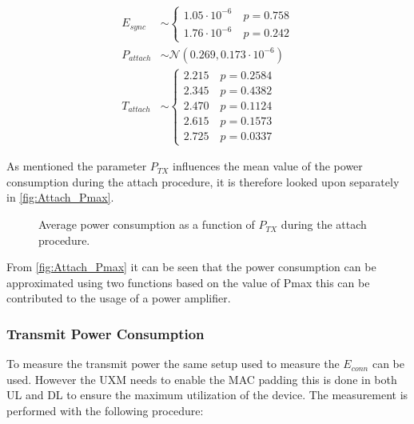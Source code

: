 \begin{align}
E_{sync} &\sim\begin{cases} 1.05\cdot 10^{-6} \quad p = 0.758\\
1.76\cdot 10^{-6} \quad p = 0.242
\end{cases}\\
P_{attach} &\sim\mathcal{N}(0.269,0.173\cdot 10^{-6}) \\
T_{attach} &\sim\begin{cases} 2.215 \quad p = 0.2584\\
2.345 \quad p = 0.4382\\
2.470 \quad p = 0.1124\\
2.615 \quad p = 0.1573\\
2.725 \quad p = 0.0337
\end{cases}
\end{align}

As mentioned the parameter $P_{TX}$ influences the mean value of the power consumption during the attach procedure, it is therefore looked upon separately in \autoref{fig:Attach_Pmax}. 

\begin{figure}[H]
\centering
\resizebox{\textwidth}{!}{
}
\caption{Average power consumption as a function of $P_{TX}$ during the attach procedure.}
\label{fig:Attach_Pmax}
\end{figure}

From \autoref{fig:Attach_Pmax} it can be seen that the power consumption can be approximated using two functions based on the value of Pmax this can be contributed to the usage of a power amplifier. 

\subsubsection{Transmit Power Consumption}

To measure the transmit power the same setup used to measure the $E_{conn}$ can be used. However the UXM needs to enable the MAC padding this is done in both UL and DL to ensure the maximum utilization of the device. The measurement is performed with the following procedure:




